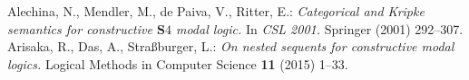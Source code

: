 \documentclass[draft]{article}
\def\S{\mathbf{S}}
\begin{document}
\begin{thebibliography}{}
%
%
%
%
Alechina, N., Mendler, M., de Paiva, V., Ritter, E.:
{\it Categorical and Kripke semantics for constructive $\S4$ modal logic.}
In {\it CSL 2001.}
Springer (2001) 292--307.
%
%
%
%
%
%
Arisaka, R., Das, A., Stra\ss burger, L.:
{\it On nested sequents for constructive modal logics.}
Logical Methods in Computer Science {\bf 11} (2015) 1--33.
%
%
%
%
%
%
%
%
%
%
%
%
%
%
%
%

\end{thebibliography}
\end{document}

